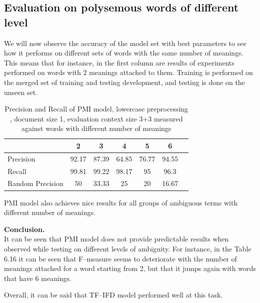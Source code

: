 \subsection{ Evaluation on polysemous words of different level}
We will now observe the accuracy of the model set with best
parameters to see how it performs on different sets of words with the same number of meanings. This means
that for instance, in the first column are results of experiments performed on words with 2 meanings attached to them.
Training is performed on the merged set of training and testing development, and testing is done on the unseen set.
\begin{table}[h!]
\begin{tabular}{ l | c c c c c c  }
     & 2 & 3 & 4 & 5 & 6  \\
 \hline
Precision  & 92.17 & 87.39 & 64.85 & 76.77 & 94.55\\ 
Recall & 99.81 & 99.22 & 98.17 & 95 & 96.3\\ 
Random Precision & 50 & 33.33 & 25 & 20 & 16.67 \\
\end{tabular}
\caption{Precision and Recall of PMI model, lowercase preprocessing , document size 1, evaluation context size 3+3 measured against words with different number of meanings}
\end{table} 

PMI model also achieves nice results for all groups of ambiguous terms with different number of meanings. 

\textbf{Conclusion.}\\
It can be seen that PMI model does not provide predictable results when observed while testing on different levels
of ambiguity. For instance, in the Table 6.16 it can be seen that F--measure seems to deteriorate with the number of meanings 
attached for a word starting from 2, but that it jumps again with words that have 6 meanings. 

Overall, it can be said that TF--IFD model performed well at this task. 



